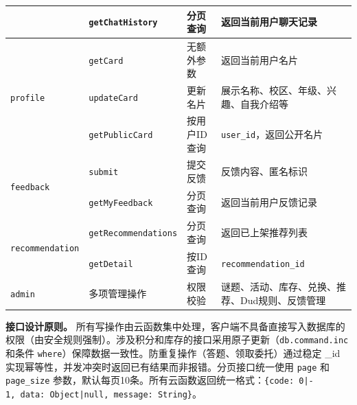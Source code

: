 \documentclass[a4paper,12pt]{article}
\begin{document}
\begin{table}[H]
{\begin{tabular}{p{2.4cm} p{3.6cm} p{2.6cm} p{5.2cm}}
                                               & \texttt{getChatHistory}     & 分页查询          & 返回当前用户聊天记录                                                          \\
      \midrule
      \multirow{3}{*}{\texttt{profile}}        & \texttt{getCard}            & 无额外参数         & 返回当前用户名片                                                            \\
                                               & \texttt{updateCard}         & 更新名片          & 展示名称、校区、年级、兴趣、自我介绍等                                                 \\
                                               & \texttt{getPublicCard}      & 按用户ID查询       & \texttt{user\_id}，返回公开名片                                            \\
      \midrule
      \multirow{2}{*}{\texttt{feedback}}       & \texttt{submit}             & 提交反馈          & 反馈内容、匿名标识                                                           \\
                                               & \texttt{getMyFeedback}      & 分页查询          & 返回当前用户反馈记录                                                          \\
      \midrule
      \multirow{2}{*}{\texttt{recommendation}} & \texttt{getRecommendations} & 分页查询          & 返回已上架推荐列表                                                           \\
                                               & \texttt{getDetail}          & 按ID查询         & \texttt{recommendation\_id}                                         \\
      \midrule
      \texttt{admin}                           & 多项管理操作                      & 权限校验          & 谜题、活动、库存、兑换、推荐、Dud规则、反馈管理                                           \\
      \bottomrule
    \end{tabular}}
\end{table}

\textbf{接口设计原则。} 所有写操作由云函数集中处理，客户端不具备直接写入数据库的权限（由安全规则强制）。涉及积分和库存的接口采用原子更新（\texttt{db.command.inc} 和条件 \texttt{where}）保障数据一致性。防重复操作（答题、领取委托）通过稳定 \_id 实现幂等性，并发冲突时返回已有结果而非报错。分页接口统一使用 \texttt{page} 和 \texttt{page\_size} 参数，默认每页10条。所有云函数返回统一格式：\texttt{\{code:\allowbreak\ 0|‐1,\allowbreak\ data:\allowbreak\ Object|null,\allowbreak\ message:\allowbreak\ String\}}。
\end{document}
